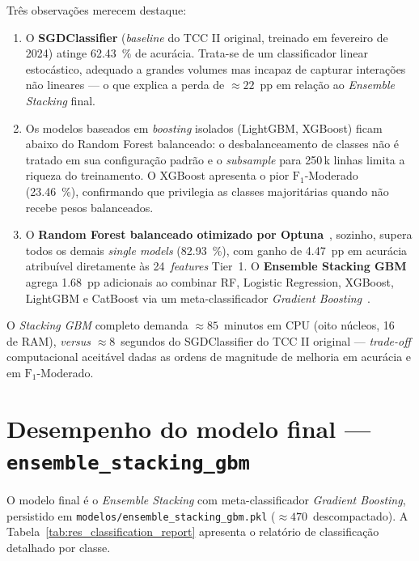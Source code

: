 Três observações merecem destaque:

\begin{enumerate}
  \item O \textbf{SGDClassifier} (\emph{baseline} do TCC II original, treinado em fevereiro de 2024) atinge \SI{62,43}{\percent} de acurácia. Trata-se de um classificador linear estocástico, adequado a grandes volumes mas incapaz de capturar interações não lineares --- o que explica a perda de \(\approx 22\)~pp em relação ao \emph{Ensemble Stacking} final.

  \item Os modelos baseados em \emph{boosting} isolados (LightGBM, XGBoost) ficam abaixo do Random Forest balanceado: o desbalanceamento de classes não é tratado em sua configuração padrão e o \emph{subsample} para 250\,k linhas limita a riqueza do treinamento. O XGBoost apresenta o pior \(\text{F}_1\)-Moderado (\SI{23,46}{\percent}), confirmando que privilegia as classes majoritárias quando não recebe pesos balanceados.

  \item O \textbf{Random Forest balanceado otimizado por Optuna}~\cite{akiba2019optuna}, sozinho, supera todos os demais \emph{single models} (\SI{82,93}{\percent}), com ganho de \SI{4,47}{pp} em acurácia atribuível diretamente às 24~\emph{features} Tier~1. O \textbf{Ensemble Stacking GBM} agrega \SI{1,68}{pp} adicionais ao combinar RF, Logistic Regression, XGBoost, LightGBM e CatBoost via um meta-classificador \emph{Gradient Boosting}~\cite{friedman2001greedy,wolpert1992stacked,chen2016xgboost,ke2017lightgbm,prokhorenkova2018catboost}.
\end{enumerate}

O \emph{Stacking GBM} completo demanda \(\approx 85\)~minutos em CPU (oito núcleos, \SI{16}{\giga\byte} de RAM), \emph{versus} \(\approx 8\)~segundos do SGDClassifier do TCC II original --- \emph{trade-off} computacional aceitável dadas as ordens de magnitude de melhoria em acurácia e em \(\text{F}_1\)-Moderado.

\section{Desempenho do modelo final --- \texttt{ensemble\_stacking\_gbm}}
\label{sec:res_modelo_final}

O modelo final é o \emph{Ensemble Stacking} com meta-classificador \emph{Gradient Boosting}, persistido em \texttt{modelos/ensemble\_stacking\_gbm.pkl} (\(\approx\num{470}\)\, descompactado). A Tabela~\ref{tab:res_classification_report} apresenta o relatório de classificação detalhado por classe.

